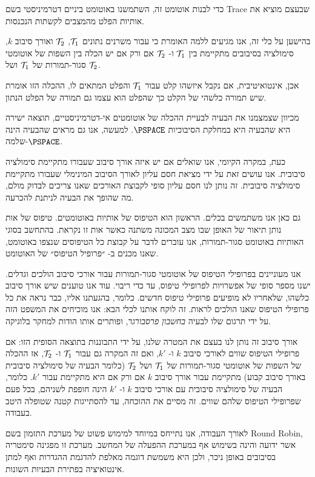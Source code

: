 {כדי לבנות אוטומט זה, השתמשנו באוטומט ביניים דטרמיניסטי בשם
\textenglish{Trace}
שבעצם מוציא את אותיות הפלט מהמצבים לקשתות הנכנסות.

בהישען על כלי זה, אנו מגיעים ללמה האומרת כי עבור משרנים נתונים
$\mathcal{T}_1$, $\mathcal{T}_2$
ואורך סיבוב
$k$,
 סימולציה בסיבובים מתקיימת בין
$\mathcal{T}_1$
ו-
$\mathcal{T}_2$
אם ורק אם יש הכלה בין השפות של אוטומטי סגור-תמורות של
$\mathcal{T}_1$
ושל
$\mathcal{T}_2$.

אכן, אינטואיטיבית, אם נקבל איזשהו קלט עבור
$\mathcal{T}_1$
והפלט המתאים לו, ההכלה הזו אומרת שיש תמורה כלשהי של הקלט כך שהפלט הוא עצמו גם תמורה של הפלט הנתון.

מכיוון שצמצמנו את הבעיה לבעיית ההכלה של אוטומטים אי-דטרמיניסטיים, תוצאה ישירה היא שהבעיה היא במחלקת הסיבוכיות
$\PSPACE$.
 למעשה, אנו גם מראים שהבעיה הינה
$\PSPACE$-שלמה.

כעת, במקרה הקיומי, אנו שואלים אם יש איזה אורך סיבוב שעבורו מתקיימת סימולציה סיבובית. אנו עושים זאת על ידי מציאת חסם עליון לאורך הסיבוב המינימלי שעבורו מתקיימת סימולציה סיבובית. זה נותן לנו חסם עליון סופי לקבוצת האורכים שאנו צריכים לבדוק מולם, מה שהופך את הבעיה לניתנת להכרעה.

גם כאן אנו משתמשים בכלים. הראשון הוא הטיפוס של אותיות באוטומטים. טיפוס של אות נותן תיאור של האופן שבו מצב המכונה משתנה כאשר אות זו נקראת. בהתחשב בסוגי האותיות באוטומט סגור-תמורות, אנו עוברים לדבר על קבוצת כל הטיפוסים שנצפו באוטומט, שאנו מכנים ב- ״פרופיל הטיפוס״ של האוטומט.

אנו מעוניינים בפרופילי הטיפוס של אוטומטי סגור-תמורות עבור אורכי סיבוב הולכים וגדלים. ישנו מספר סופי של אפשרויות לפרופילי טיפוס, עד כדי ריבוי. עוד אנו טוענים שיש אורך סיבוב כלשהו, שלאחריו לא מופיעים פרופילי טיפוס חדשים. כלומר, בהגעתנו אליו, כבר נראה את כל פרופילי הטיפוס שאנו הולכים לראות. זה לוקח אותנו לכלי הבא: אנו מוכיחים את המשפט הזה על ידי תרגום שלו לבעיה 
\emph{בחשבון פרסבורגר}, 
ופותרים אותו הודות למחקר בלוגיקה.

אורך סיבוב זה נותן לנו בעצם את המטרה שלנו, על ידי התבוננות בתוצאה הסופית הזו: אם פרופילי הטיפוס שווים לאורכי סיבוב
$k$
ו-
$k'$,
 ואם זה המקרה גם עבור
$\mathcal{T}_1$
ו-
$\mathcal{T}_2$,
אז ההכלה של השפות של אוטומטי סגור-תמורות של
$\mathcal{T}_1$
ושל
$\mathcal{T}_2$
(כלומר הבעיה של סימולציה סיבובית באורך סיבוב קבוע) מתקיימת עבור אורך סיבוב
$k$
אם ורק אם היא מתקיימת עבור
$k'$.
 כלומר, הבעיה של סימולציה סיבובית עם אורכי סיבוב
$k$
ו-
$k'$
הינה חופפת לשניהם, בכל פעם שפרופילי הטיפוס שלהם שווים. זה מסיים את ההוכחה, עד להסתייגות קטנה שטופלה היטב בעבודה.

לאורך העבודה, אנו נתייחס במיוחד למימוש פשוט של מערכת התזמון בשם 
\textenglish{Round Robin},
אשר ידועה והינה בשימוש אף במערכת ההפעלה של המחשב. מערכת זו מפגינה סימטריה בסיבובים באופן ניכר, ולכן היא משמשת דוגמה מאלפת להדגמת ההגדרות ואף למתן אינטואיציה בפתירת הבעיות השונות.

}
